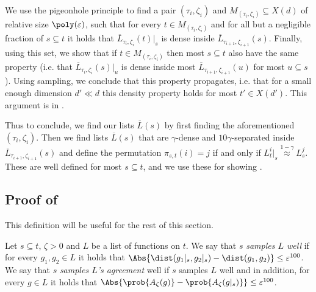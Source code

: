 We use the pigeonhole principle to find a pair \((\tau_i,\zeta_i)\) and \(M_{(\tau_i,\zeta_i)} \subseteq X(d)\) of relative size \(\poly(\varepsilon)\), such that for every \(t \in M_{(\tau_i,\zeta_i)}\) and for all but a negligible fraction of \(s \subseteq t\) it holds that \(\overline{L}_{\tau_i,\zeta_i}(t)|_s\) is dense inside \(\overline{L}_{\tau_{i+1},\zeta_{i+1}}(s)\). Finally, using this set, we show that if \(t \in M_{(\tau_i,\zeta_i)}\) then most \(s \subseteq t\) also have the same property (i.e. that \(\overline{L}_{\tau_i,\zeta_i}(s)|_u\) is dense inside most \(\overline{L}_{\tau_{i+1},\zeta_{i+1}}(u)\) for most \(u \subseteq s\)). Using sampling, we conclude that this property propagates, i.e. that for a small enough dimension \(d' \ll d\) this density property holds for most \(t' \in X(d')\). This argument is in .

Thus to conclude, we find our lists \(\overline{L}(s)\) by first finding the aforementioned \((\tau_i,\zeta_i)\). Then we find lists \(\overline{L}(s)\) that are \(\gamma\)-dense and \(10\gamma\)-separated inside \(\overline{L}_{\tau_{i+1},\zeta_{i+1}}(s)\) and define the permutation \(\pi_{s,t}(i)=j\) if and only if \(L_t^i|_s \overset{1-\gamma}{\approx} L_s^j\). These are well defined for most \(s \subseteq t\), and we use these for showing .

\subsection{Proof of }
This definition will be useful for the rest of this section.
\begin{definition}
    Let \(s \subseteq t\), \(\zeta > 0\) and \(L\) be a list of functions on \(t\). %
    We say that \(s\) \emph{samples \(L\) well} if %
    for every \(g_1,g_2 \in L\) it holds that \(\Abs{\dist(g_1|_s,g_2|_s) - \dist(g_1,g_2)} \leq \varepsilon^{100}\). We say that \(s\) \emph{samples \(L\)'s agreement} well if \(s\) samples \(L\) well and in addition, for every \(g \in L\) it holds that \(\Abs{\prob{A_{\zeta}(g)}- \prob{A_{\zeta}(g|_s)}} \leq \varepsilon^{100}\).
\end{definition}

